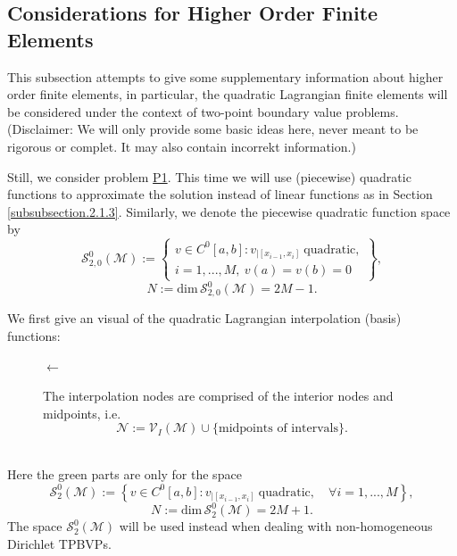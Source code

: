 	\subsection{Considerations for Higher Order Finite Elements}
	\label{subsection.4.5}
	This subsection attempts to give some supplementary information about 
	higher order finite elements, in particular, the quadratic Lagrangian 
	finite elements will be considered under the context of two-point boundary
	value problems. (Disclaimer: We will only provide some basic ideas here, 
	never meant to be rigorous or complet. It may also contain incorrekt 
	information.)
	
	
	Still, we consider problem \hyperlink{P1}{P1}. This time we will use
	(piecewise) quadratic functions to approximate the solution instead of 
	linear functions as in Section \ref{subsubsection.2.1.3}. Similarly, 
	we denote the piecewise quadratic function space by
	\[\mathcal{S}_{2,0}^{0}(\mathcal{M}) := \left\{
	\begin{array}{l}
		v\in C^0{[a,b]}: v_{|[x_{i-1},x_i]}\ \textrm{quadratic},\\
		i=1,...,M,\ v(a)=v(b)=0
	\end{array}\right\},\]
	\[ N:=\mathrm{dim}\,\mathcal{S}_{2,0}^{0}(\mathcal{M})=2M-1.\]
	
	We first give an visual of the quadratic Lagrangian interpolation
	(basis) functions:
	\begin{figure}[!htbp]
		\begin{minipage}{.5\textwidth}
			
		\end{minipage}$\longleftarrow$\quad\hfill
		\begin{minipage}{.4\textwidth}
			\vspace{-10pt}
			The interpolation nodes are comprised of the interior nodes
			and midpoints, i.e.
			\[\mathcal{N}:=\mathcal{V}_I(\mathcal{M})\cup\{
				\textrm{midpoints of intervals}\}. \]
		\end{minipage}
	\end{figure}\\
	Here the \textcolor{mid-green}{green} parts are only for the space 
	\[\mathcal{S}_{2}^{0}(\mathcal{M}) := \left\{
		v\in C^0{[a,b]}: v_{|[x_{i-1},x_i]}\ \textrm{quadratic},
		\quad \forall i=1,...,M \right\},\]
	\[ N:=\mathrm{dim}\,\mathcal{S}_{2}^{0}(\mathcal{M})=2M+1.\]
	The space $\mathcal{S}_{2}^{0}(\mathcal{M})$ will be used instead when 
	dealing with non-homogeneous Dirichlet TPBVPs.
	
